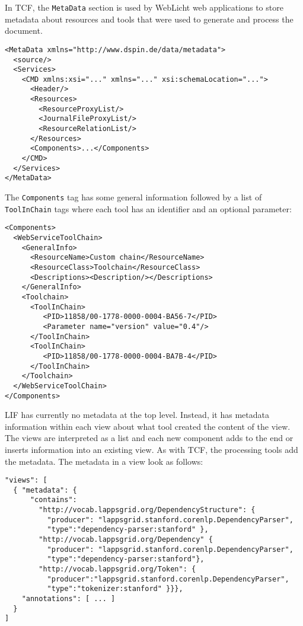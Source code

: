 \documentclass[11pt]{article}
\newcommand{\tag}[1]{{\tt #1}}
\newenvironment{example}
    {\begin{tcolorbox}\small}
    {\end{tcolorbox}}
\begin{document}
In TCF, the \tag{MetaData} section is used by WebLicht web applications to store metadata about resources and tools that were used to generate and process the document.

\begin{example}
\begin{verbatim}
<MetaData xmlns="http://www.dspin.de/data/metadata">
  <source/>
  <Services>
    <CMD xmlns:xsi="..." xmlns="..." xsi:schemaLocation="...">
      <Header/>
      <Resources>
        <ResourceProxyList/>
        <JournalFileProxyList/>
        <ResourceRelationList/>
      </Resources>
      <Components>...</Components>
    </CMD>
  </Services>
</MetaData>
\end{verbatim}
\end{example}

The \tag{Components} tag has some general information followed by a list of \tag{ToolInChain} tags where each tool has an identifier and an optional parameter:

\begin{example}
\begin{verbatim}
<Components>
  <WebServiceToolChain>
    <GeneralInfo>
      <ResourceName>Custom chain</ResourceName>
      <ResourceClass>Toolchain</ResourceClass>
      <Descriptions><Description/></Descriptions>
    </GeneralInfo>
    <Toolchain>
      <ToolInChain>
         <PID>11858/00-1778-0000-0004-BA56-7</PID>
         <Parameter name="version" value="0.4"/>
      </ToolInChain>
      <ToolInChain>
         <PID>11858/00-1778-0000-0004-BA7B-4</PID>
      </ToolInChain>
    </Toolchain>
  </WebServiceToolChain>
</Components>
\end{verbatim}
\end{example}

LIF has currently no metadata at the top level. Instead, it has metadata information within each view about what tool created the content of the view. The views are interpreted as a list and each new component adds to the end or inserts information into an existing view. As with TCF, the processing tools add the metadata. The metadata in a view look as follows:

\begin{example}
\begin{verbatim}
"views": [
  { "metadata": {
      "contains":
        "http://vocab.lappsgrid.org/DependencyStructure": {
          "producer": "lappsgrid.stanford.corenlp.DependencyParser",
          "type":"dependency-parser:stanford" },
        "http://vocab.lappsgrid.org/Dependency" {
          "producer": "lappsgrid.stanford.corenlp.DependencyParser",
          "type":"dependency-parser:stanford"},
        "http://vocab.lappsgrid.org/Token": {
          "producer":"lappsgrid.stanford.corenlp.DependencyParser",
          "type":"tokenizer:stanford" }}},
    "annotations": [ ... ]
  }
]
\end{verbatim}
\end{example}
\end{document}
